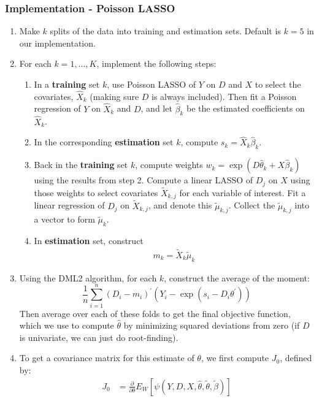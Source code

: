 \documentclass[11pt]{article}
\begin{document}
\subsubsection{Implementation - Poisson LASSO}
\begin{enumerate}
	\item Make $k$ splits of the data into training and estimation sets. Default is $k=5$ in our implementation.
  \item For each $k = 1, ..., K$, implement the following steps:
  \begin{enumerate}
    \item In a \textbf{training} set $k$, use Poisson LASSO of $Y$ on $D$ and $X$ to select the covariates, $\hat{X}_k$ (making sure $D$ is always included). Then fit a Poisson regression of $Y$ on $\hat{X}_k$ and $D$, and let $\hat{\beta}_k$ be the estimated coefficients on $\hat{X}_k$.
  	\item In the corresponding \textbf{estimation} set $k$, compute $s_k = \hat{X}_k \hat{\beta}_k$.
  	\item Back in the \textbf{training} set $k$, compute weights $w_k = \exp(D\hat{\theta}_k + X\hat{\beta}_k)$ using the results from step 2.  Compute a linear LASSO of $D_j$ on $X$ using those weights to select covariates $\tilde{X}_{k,j}$ for each variable of interest. Fit a linear regression of $D_j$ on $\tilde{X}_{k,j}$, and denote this $\tilde{\mu}_{k,j}$. Collect the $\tilde{\mu}_{k,j}$ into a vector to form $\tilde{\mu}_k$.
  	\item In \textbf{estimation} set, construct
  	\begin{gather*}
  		m_k = \tilde{X}_k\tilde{\mu}_k
  	\end{gather*}
  \end{enumerate}
	\item Using the DML2 algorithm, for each $k$, construct the average of the moment:
	$$
	\frac{1}{n} \sum_{i=1}^{n}\left(D_{i}-m_{i}\right)^{\prime}\left(Y_{i}-\exp(s_{i}-D_{i} \theta^{\prime})\right)
	$$
	Then average over each of these folds to get the final objective function, which we use to compute
	$\hat{\theta}$ by minimizing squared deviations from zero (if $D$ is univariate, we can just do root-finding).
	\item To get a covariance matrix for this estimate of $\theta$, we first compute $J_0$, defined by:
	\begin{align*}
		J_0 &= \frac{\partial}{\partial \theta} E_W \left[\psi(Y,D,X,\hat{\theta},\tilde{\theta}, \tilde{\beta}) \right]\\

\end{align*}
\end{enumerate}
\end{document}
